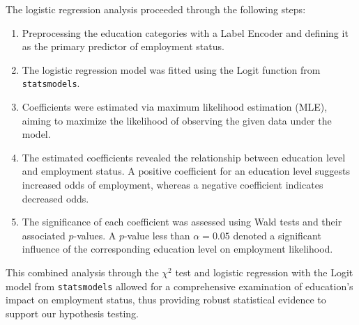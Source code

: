 The logistic regression analysis proceeded through the following steps:
\begin{enumerate}
    \item Preprocessing the education categories with a Label Encoder and defining it as the primary predictor of employment status.
    \item The logistic regression model was fitted using the Logit function from \texttt{statsmodels}.
    \item Coefficients were estimated via maximum likelihood estimation (MLE), aiming to maximize the likelihood of observing the given data under the model.
    \item The estimated coefficients revealed the relationship between education level and employment status. A positive coefficient for an education level suggests increased odds of employment, whereas a negative coefficient indicates decreased odds.
    \item The significance of each coefficient was assessed using Wald tests and their associated \( p \)-values. A \( p \)-value less than \( \alpha = 0.05 \) denoted a significant influence of the corresponding education level on employment likelihood.
\end{enumerate}

This combined analysis through the $\chi^2$ test and logistic regression with the Logit model from \texttt{statsmodels} allowed for a comprehensive examination of education's impact on employment status, thus providing robust statistical evidence to support our hypothesis testing.

